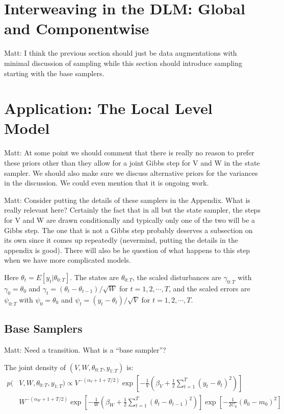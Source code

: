 \documentclass{article}
\newcommand{\matt}[1]{{\color{red} Matt: #1}}
\begin{document}
\section{Interweaving in the DLM: Global and Componentwise}\label{sec:DLMinter}
\matt{I think the previous section should just be data augmentations with minimal discussion of sampling while this section should introduce sampling starting with the base samplers.}




\section{Application: The Local Level Model}\label{sec:LLMest}

 \matt{At some point we should comment that there is really no reason to prefer these priors other than they allow for a joint Gibbs step for V and W in the state sampler. We should also make sure we discuss alternative priors for the variances in the discussion. We could even mention that it is ongoing work.}

\matt{Consider putting the details of these samplers in the Appendix. What is really relevant here? Certainly the fact that in all but the state sampler, the steps for V and W are drawn conditionally and typically only one of the two will be a Gibbs step. The one that is not a Gibbs step probably deserves a subsection on its own since it comes up repeatedly (nevermind, putting the details in the appendix is good). There will also be he question of what happens to this step when we have more complicated models.}


Here $\theta_t=E[y_t|\theta_{0:T}]$. The states are $\theta_{0:T}$, the scaled disturbances are $\gamma_{0:T}$ with $\gamma_0=\theta_0$ and $\gamma_t=(\theta_t - \theta_{t-1})/\sqrt{W}$ for $t=1,2,\cdots,T$, and the scaled errors are $\psi_{0:T}$ with $\psi_0=\theta_0$ and $\psi_t=(y_t - \theta_t)/\sqrt{V}$ for $t=1,2,\cdots,T$. 

\subsection{Base Samplers}\label{sec:LLMbase}

\matt{Need a transition. What is a ``base sampler''?}

The joint density of $(V,W,\theta_{0:T},y_{1:T})$ is:
\begin{align}
  p(&V,W,\theta_{0:T},y_{1:T}) \propto V^{-(\alpha_V + 1 + T/2)} \exp\left[-\frac{1}{V}\left(\beta_V + \frac{1}{2}\textstyle\sum_{t=1}^T(y_t - \theta_{t})^2\right)\right]\nonumber\\
  &W^{-(\alpha_W + 1 + T/2)}\exp\left[-\frac{1}{W}\left(\beta_W + \frac{1}{2}\textstyle\sum_{t=1}^T(\theta_t - \theta_{t-1})^2\right) \right] \exp\left[-\frac{1}{2C_0}(\theta_0 - m_0)^2\right]\label{llmstatejoint}
\end{align}
\end{document}
